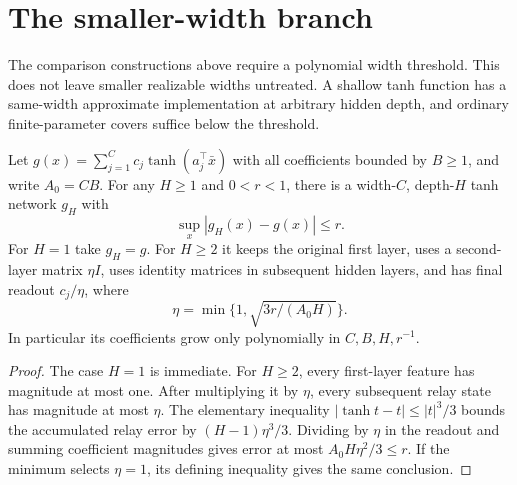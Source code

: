 \section{The smaller-width branch}
\label{sec:small-width-shallow}
The comparison constructions above require a polynomial width threshold. This does not leave smaller realizable widths untreated. A shallow tanh function has a same-width approximate implementation at arbitrary hidden depth, and ordinary finite-parameter covers suffice below the threshold.

\begin{lemma}
\label{lem:relay}
Let $g(x)=\sum_{j=1}^C c_j\tanh(a_j^\top\bar x)$ with all coefficients bounded by $B\ge1$, and write $A_0=CB$. For any $H\ge1$ and $0<r<1$, there is a width-$C$, depth-$H$ tanh network $g_H$ with
\[
 \sup_x|g_H(x)-g(x)|\le r.
\]
For $H=1$ take $g_H=g$. For $H\ge2$ it keeps the original first layer, uses a second-layer matrix $\eta I$, uses identity matrices in subsequent hidden layers, and has final readout $c_j/\eta$, where
\[
 \eta=\min\{1,\sqrt{3r/(A_0H)}\}.
\]
In particular its coefficients grow only polynomially in $C,B,H,r^{-1}$.
\end{lemma}
\begin{proof}
The case $H=1$ is immediate. For $H\ge2$, every first-layer feature has magnitude at most one. After multiplying it by $\eta$, every subsequent relay state has magnitude at most $\eta$. The elementary inequality
$|\tanh t-t|\le|t|^3/3$ bounds the accumulated relay error by $(H-1)\eta^3/3$. Dividing by $\eta$ in the readout and summing coefficient magnitudes gives error at most $A_0H\eta^2/3\le r$. If the minimum selects $\eta=1$, its defining inequality gives the same conclusion.
\end{proof}

